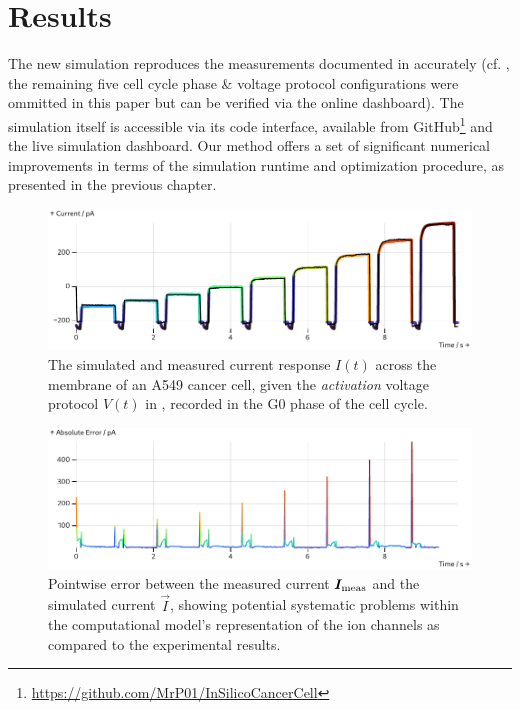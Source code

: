 \section{Results}
The new simulation reproduces the measurements documented in \cite{2021-A549-model} accurately (cf. , the remaining five cell cycle phase \& voltage protocol configurations were ommitted in this paper but can be verified via the online dashboard).
The simulation itself is accessible via its code interface, available from GitHub\footnote{\url{https://github.com/MrP01/InSilicoCancerCell}} and the live simulation dashboard.
Our method offers a set of significant numerical improvements in terms of the simulation runtime and optimization procedure, as presented in the previous chapter.

\begin{figure}[ht]
  \includegraphics[width=\columnwidth]{../figures/results/full-simulation-current.pdf}
  \caption{The simulated and measured current response $I(t)$ across the membrane of an A549 cancer cell, given the \textit{activation} voltage protocol $V(t)$ in , recorded in the G0 phase of the cell cycle.}
  \label{figure:full-simulation-current}
\end{figure}
\begin{figure}
  \includegraphics[width=\columnwidth]{../figures/results/simulation-error.pdf}
  \caption{Pointwise error between the measured current $\vec{I}_{\rm meas}$ and the simulated current $\vec{I}$, showing potential systematic problems within the computational model's representation of the ion channels as compared to the experimental results.}
  \label{figure:simulation-error}
\end{figure}

